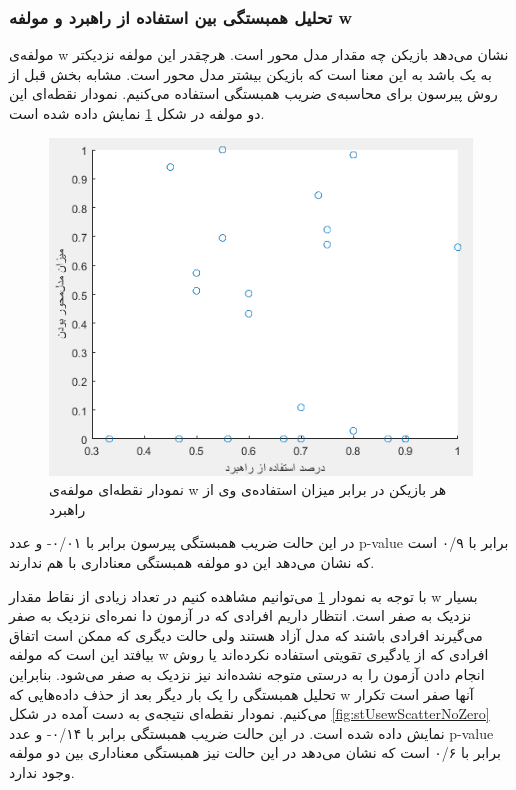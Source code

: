 \documentclass[twoside, a4paper,11pt]{book}
\numberwithin{equation}{chapter}
\numberwithin{table}{chapter}
\numberwithin{figure}{chapter}
\numberwithin{equation}{chapter}
\begin{document}
\subsubsection{تحلیل همبستگی بین استفاده از راهبرد و مولفه w }

مولفه‌ی w نشان می‌دهد بازیکن چه مقدار مدل محور است. هرچقدر این مولفه نزدیکتر به یک باشد به این معنا است که بازیکن بیشتر مدل محور است. مشابه بخش قبل از روش پیرسون برای محاسبه‌ی ضریب همبستگی استفاده می‌کنیم. نمودار نقطه‌ای این دو مولفه در شکل \ref{fig:stUsewScatter} نمایش داده شده است.

\begin{figure}
\centering
\includegraphics[scale=0.8]{Figures/stUsewScatter.png}
\caption{\label{fig:stUsewScatter}
نمودار نقطه‌ای مولفه‌ی w هر بازیکن در برابر میزان استفاده‌ی وی از راهبرد
}
\end{figure}

در این حالت ضریب همبستگی پیرسون برابر با ۰/۰۱- و عدد p-value برابر با ۰/۹ است که نشان می‌دهد این دو مولفه همبستگی معناداری با هم ندارند.

با توجه به نمودار \ref{fig:stUsewScatter} می‌توانیم مشاهده کنیم در تعداد زیادی از نقاط مقدار w بسیار نزدیک به صفر است. انتظار داریم افرادی که در آزمون دا نمره‌ای نزدیک به صفر می‌گیرند افرادی باشند که مدل آزاد هستند ولی حالت دیگری که ممکن است اتفاق بیافتد این است که مولفه w افرادی که از یادگیری تقویتی استفاده نکرده‌اند یا روش انجام دادن آزمون را به درستی متوجه نشده‌اند نیز نزدیک به صفر می‌شود. بنابراین تحلیل همبستگی را یک بار دیگر بعد از حذف داده‌هایی که w آنها صفر است تکرار می‌کنیم. نمودار نقطه‌ای نتیجه‌ی به دست آمده در شکل \ref{fig:stUsewScatterNoZero} نمایش داده شده است. در این حالت ضریب همبستگی برابر با ۰/۱۴- و عدد p-value برابر با ۰/۶ است که نشان می‌دهد در این حالت نیز همبستگی معناداری بین دو مولفه وجود ندارد.
\end{document}
